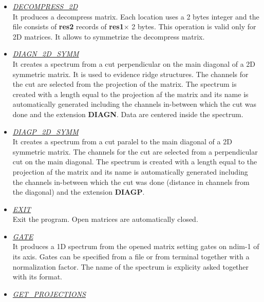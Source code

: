 \begin{itemize}
 \item	{\it\underline{DECOMPRESS\_2D}} \\

	It produces a decompress matrix. Each location uses a 2 bytes integer
	and the file consists of {\bf res2} records of {\bf res1}$\times$ 2 
	bytes. This operation is valid only for 2D matrices. It allows to
	symmetrize the decompress matrix.

 \item	{\it\underline{DIAGN\_2D\_SYMM}} \\

	It creates a spectrum from a cut perpendicular on the main diagonal of
	a 2D symmetric matrix. It is used to evidence ridge structures. The 
	channels for the cut are selected from the projection of the matrix.
	The spectrum is created with a length equal to the projection af the
	matrix and its name is automatically generated including the channels
	in-between which the cut was done and the extension {\bf DIAGN}. Data
	are centered inside the spectrum. 

 \item	{\it\underline{DIAGP\_2D\_SYMM}} \\

	It creates a spectrum from a cut paralel to the main diagonal of
	a 2D symmetric matrix. The channels for the cut are selected from a 
	perpendicular cut on the main diagonal.
	The spectrum is created with a length equal to the projection af the
	matrix and its name is automatically generated including the channels
	in-between which the cut was done (distance in channels from the
	diagonal) and the extension {\bf DIAGP}.

 \item	{\it\underline{EXIT}} \\

	Exit the program. Open matrices are automatically closed.

 \item	{\it\underline{GATE}} \\

	It produces a 1D spectrum from the opened matrix setting gates on
	ndim-1 of its axis. Gates can be specified from a file or from terminal
	together with a normalization factor. The name of the spectrum is
	explicity asked together with its format.

 \item	{\it\underline{GET\_PROJECTIONS}} \\


\end{itemize}
